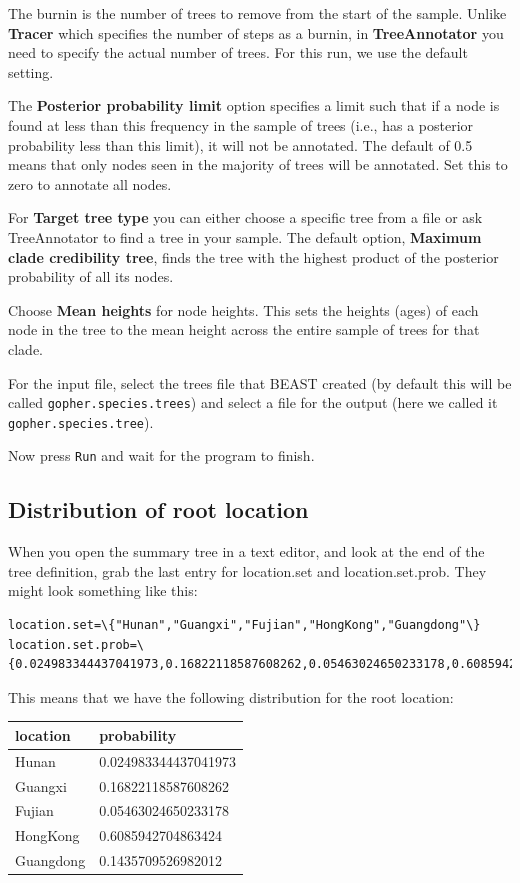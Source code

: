 \documentclass{article}
\begin{document}
The burnin is the number of trees to remove from the start of the sample. Unlike {\bf Tracer} which specifies the number of steps as a burnin, in {\bf TreeAnnotator} you need to specify the actual number of trees. For this run, we use the default setting.

The {\bf Posterior probability limit} option specifies a limit such that if a node is found at less than this frequency in the sample of trees (i.e., has a posterior probability less than this limit), it will not be annotated. The default of 0.5 means that only nodes seen in the majority of trees will be annotated. Set this to zero to annotate all nodes.

For {\bf Target tree type} you can either choose a specific tree from a file or ask TreeAnnotator to find a tree in your sample. The default option, {\bf Maximum clade credibility tree}, finds the tree with the highest product of the posterior probability of all its nodes.

Choose {\bf Mean heights} for node heights. This sets the heights (ages) of each node in the tree to the mean height across the entire sample of trees for that clade.

For the input file, select the trees file that BEAST created (by default this will be called \texttt{gopher.species.trees}) and select a file for the output (here we called it \texttt{gopher.species.tree}).

Now press \texttt{Run} and wait for the program to finish.

\subsection*{Distribution of root location}

When you open the summary tree in a text editor, and look at the end of the tree definition, grab the last entry for location.set and location.set.prob. They might look something like this:

\begin{verbatim}
location.set=\{"Hunan","Guangxi","Fujian","HongKong","Guangdong"\}
location.set.prob=\{0.024983344437041973,0.16822118587608262,0.05463024650233178,0.6085942704863424,0.1435709526982012\}
\end{verbatim}

This means that we have the following distribution for the root location:

\begin{tabular}{l|l}
\hline
location & probability\\
\hline
Hunan&0.024983344437041973\\
Guangxi&0.16822118587608262\\
Fujian&0.05463024650233178\\
HongKong&0.6085942704863424\\
Guangdong&0.1435709526982012\\
\hline
\end{tabular}
\end{document}
